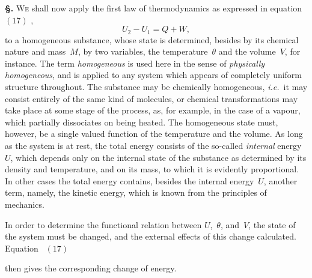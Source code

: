 \documentclass[12pt]{book}[2005/09/16]
\newcommand{\Section}[1]{
  \medskip\par\textbf{§\;#1}
  \label{section:#1}
}
\newcommand{\Eq}[1]{%
  \hyperref[eqn:#1]{\ensuremath{#1}}%
}
\newcommand{\PageSep}[1]{\ignorespaces}
\newcommand{\ie}{\emph{i.e.}}
\newcommand{\First}[1]{\textsc{#1}}
\begin{document}
\Section{67.} \First{We} shall now apply the first law of thermodynamics
%
as expressed in equation~\Eq{(17)},
\[
U_{2} - U_{1} = Q + W,
\]
to a homogeneous substance, whose state is determined,
besides by its chemical nature and mass~$M$, by two variables,
the temperature~$\theta$ and the volume~$V$, for instance.
The term \emph{homogeneous} is used here in the sense of \emph{physically
homogeneous}, and is applied to any system which appears
of completely uniform structure throughout. The substance
may be chemically homogeneous, \ie\ it may consist
entirely of the same kind of molecules, or chemical transformations
may take place at some stage of the process,
as, for example, in the case of a vapour, which partially
dissociates on being heated. The homogeneous state must,
however, be a single valued function of the temperature
and the volume. As long as the system is at rest, the
total energy consists of the so-called \emph{internal} energy~$U$,
which depends only on the internal state of the substance
as determined by its density and temperature, and on its
mass, to which it is evidently proportional. In other cases
the total energy contains, besides the internal energy~$U$,
another term, namely, the kinetic energy, which is known
from the principles of mechanics.

In order to determine the functional relation between $U$,~$\theta$,
and~$V$, the state of the system must be changed, and the
external effects of this change calculated. Equation~\Eq{(17)}
then gives the corresponding change of energy.
\PageSep{47}
\end{document}
